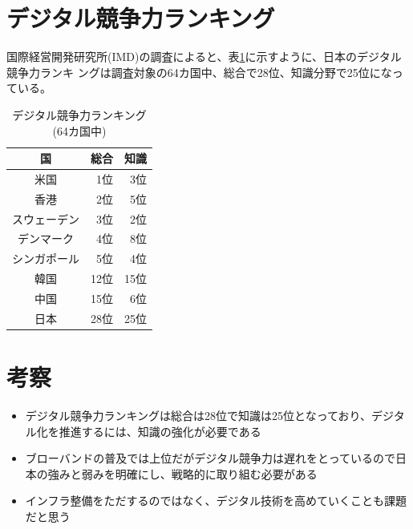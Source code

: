 \documentclass[a4paper,11pt,dvipdfmx]{ujarticle}
\begin{document}
\section{デジタル競争力ランキング}

国際経営開発研究所(IMD)の調査\cite{IMD}によると、表\ref{tbl:利用状況}に示すように、日本のデジタル競争力ランキ
ングは調査対象の64カ国中、総合で28位、知識分野で25位になっている。

\begin{table}[htbp]
    \centering
    \caption{デジタル競争力ランキング(64カ国中)}
    \label{tbl:利用状況}

    \begin{tabular}{|c|r|r|}\hline
        国 & 総合 & 知識 \\
        \hline
        米国 & 1位 & 3位 \\
        \hline
        香港 & 2位 & 5位 \\
        \hline
        スウェーデン & 3位 & 2位 \\
        \hline
        デンマーク & 4位 & 8位 \\
        \hline
        シンガポール & 5位 & 4位 \\
        \hline
        \hline
        韓国 & 12位 & 15位 \\
        \hline
        中国 & 15位 & 6位 \\
        \hline
        \hline
        日本 & 28位 & 25位 \\
         \hline

        
        
    \end{tabular}
    
\end{table}

\section{考察}

%
\begin{itemize}
    \item デジタル競争力ランキングは総合は28位で知識は25位となっており、デジタル化を推進するには、知識の強化が必要である
    \item ブローバンドの普及では上位だがデジタル競争力は遅れをとっているので日本の強みと弱みを明確にし、戦略的に取り組む必要がある
    \item インフラ整備をただするのではなく、デジタル技術を高めていくことも課題だと思う
\end{itemize}

%


\end{document}
